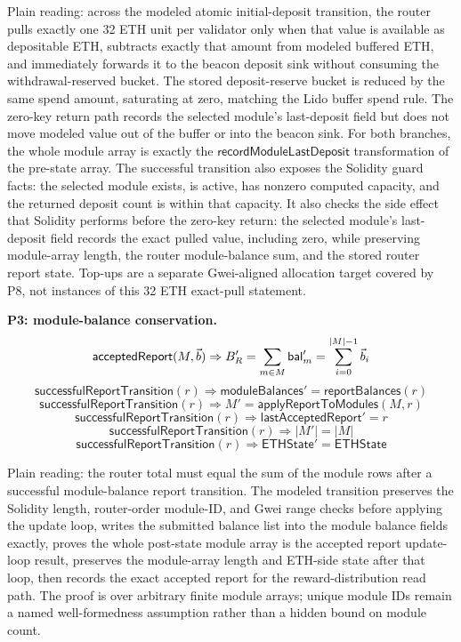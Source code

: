 \noindent Plain reading: across the modeled atomic initial-deposit transition,
the router pulls exactly one 32 ETH unit per validator only when that value is
available as depositable ETH, subtracts exactly that amount from modeled
buffered ETH, and immediately forwards it to the beacon deposit sink without
consuming the withdrawal-reserved bucket. The stored deposit-reserve bucket is
reduced by the same spend amount, saturating at zero, matching the Lido buffer
spend rule.
The zero-key return path records the selected module's last-deposit field but
does not move modeled value out of the buffer or into the beacon sink.
For both branches, the whole module array is exactly the
\(\mathsf{recordModuleLastDeposit}\) transformation of the pre-state array.
The successful transition also exposes the Solidity guard facts: the selected
module exists, is active, has nonzero computed capacity, and the returned deposit
count is within that capacity. It also checks the side effect that Solidity
performs before the zero-key return: the selected module's last-deposit field
records the exact pulled value, including zero, while preserving module-array
length, the router module-balance sum, and the stored router report state.
Top-ups are a separate Gwei-aligned allocation target covered by P8, not
instances of this 32 ETH exact-pull statement.

\medskip
\noindent\textbf{P3: module-balance conservation.}
\[
  \mathsf{acceptedReport}(M,\vec{b})
  \Rightarrow
  B_R' = \sum_{m \in M} \mathsf{bal}_m'
  = \sum_{i=0}^{|M|-1} \vec{b}_i
\]
\[
  \mathsf{successfulReportTransition}(r)
  \Rightarrow
  \mathsf{moduleBalances}' = \mathsf{reportBalances}(r)
\]
\[
  \mathsf{successfulReportTransition}(r)
  \Rightarrow
  M' = \mathsf{applyReportToModules}(M,r)
\]
\[
  \mathsf{successfulReportTransition}(r)
  \Rightarrow
  \mathsf{lastAcceptedReport}' = r
\]
\[
  \mathsf{successfulReportTransition}(r)
  \Rightarrow
  |M'| = |M|
\]
\[
  \mathsf{successfulReportTransition}(r)
  \Rightarrow
  \mathsf{ETHState}' = \mathsf{ETHState}
\]

\noindent Plain reading: the router total must equal the sum of the module rows
after a successful module-balance report transition. The modeled transition
preserves the Solidity length, router-order module-ID, and Gwei range checks
before applying the update loop, writes the submitted balance list into the
module balance fields exactly, proves the whole post-state module array is the
accepted report update-loop result, preserves the module-array length and
ETH-side state after that loop, then records the exact accepted report for the
reward-distribution read path.
The proof is over arbitrary finite module arrays; unique module IDs remain a
named well-formedness assumption rather than a hidden bound on module count.

